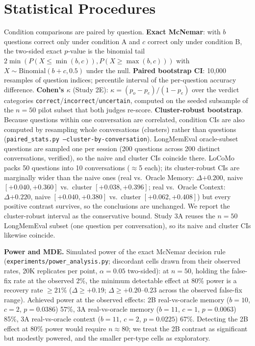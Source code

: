 \documentclass[11pt]{article}
\begin{document}
\section{Statistical Procedures}
\label{app:stats}

Condition comparisons are paired by question. \textbf{Exact McNemar}: with
$b$ questions correct only under condition A and $c$ correct only under
condition B, the two-sided exact $p$-value is the binomial tail
$2\min(P(X\leq \min(b,c)), P(X\geq \max(b,c)))$ with $X\sim
\mathrm{Binomial}(b{+}c, 0.5)$ under the null. \textbf{Paired bootstrap
CI}: 10{,}000 resamples of question indices; percentile interval of the
per-question accuracy difference. \textbf{Cohen's $\kappa$}
(Study 2E): $\kappa = (p_o - p_e)/(1 - p_e)$ over the verdict categories
\texttt{correct}/\texttt{incorrect}/\texttt{uncertain}, computed on the
seeded subsample of the $n{=}50$ pilot subset that both judges re-score.
\textbf{Cluster-robust
bootstrap}. Because questions within one conversation are correlated,
condition CIs are also computed by resampling whole conversations
(clusters) rather than questions
(\texttt{paired\_stats.py --cluster-by-conversation}). LongMemEval
oracle-subset questions are sampled one per session (200 questions across
200 distinct conversations, verified), so the naive and cluster CIs
coincide there.
LoCoMo packs 50 questions into 10 conversations ($\approx$5 each); its
cluster-robust CIs are marginally wider than the naive ones (real vs.\
Oracle Memory: $\Delta{+0.200}$, naive $[+0.040,+0.360]$ vs.\ cluster
$[+0.038,+0.396]$; real vs.\ Oracle Context: $\Delta{+0.220}$, naive
$[+0.040,+0.380]$ vs.\ cluster $[+0.062,+0.408]$) but every positive
contrast survives, so the conclusions are unchanged. We report the
cluster-robust interval as the conservative bound. Study 3A reuses the
$n{=}50$ LongMemEval subset (one question per conversation), so its
naive and cluster CIs likewise coincide.

\textbf{Power and MDE.} Simulated power of the exact McNemar decision rule
(\texttt{experiments/power\_analysis.py}; discordant cells drawn from their
observed rates, 20K replicates per point, $\alpha{=}0.05$ two-sided): at
$n{=}50$, holding the false-fix rate at the observed 2\%, the minimum
detectable effect at 80\% power is a recovery rate ${\ge}21\%$
($\Delta{\ge}+0.19$; $\Delta{\ge}+0.20$--$0.23$ across the observed
false-fix range). Achieved power at the observed effects: 2B real-vs-oracle
memory ($b{=}10$, $c{=}2$, $p{=}0.0386$) 57\%, 3A real-vs-oracle memory
($b{=}11$, $c{=}1$, $p{=}0.0063$) 85\%, 3A real-vs-oracle context
($b{=}11$, $c{=}2$, $p{=}0.0225$) 67\%. Detecting the 2B effect at 80\%
power would require $n{\approx}80$; we treat the 2B contrast as significant
but modestly powered, and the smaller per-type cells as exploratory.
\end{document}
